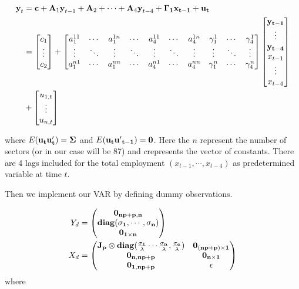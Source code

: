 \documentclass[11pt,a4paper,]{article}
\begin{document}
\begin{align}
\textbf{y}_t&=\textbf{c}+\textbf{A}_1 \textbf{y}_{t-1}+\textbf{A}_2+\cdots+\textbf{A}_4\textbf{y}_{t-4}+\bf{\Gamma}_1\textbf{x}_{t-1}+\bf{u}_t\\
&=
\begin{bmatrix}
c_1\\
\vdots\\
c_2
\end{bmatrix}
+
\begin{bmatrix}
a_1^{11}&\cdots&a_1^{1n}&\cdots&a_4^{11}&\cdots&a_4^{1n}&\gamma_1^{1}&\cdots&\gamma_4^{1}\\
\vdots&\ddots&\vdots&\ddots&\vdots&\ddots&\vdots&\vdots&\ddots&\vdots\\
a_1^{n1}&\cdots&a_1^{nn}&\cdots&a_4^{n1}&\cdots&a_4^{nn}&\gamma_1^n&\cdots&\gamma_4^n\\
\end{bmatrix}
\begin{bmatrix}
\bf{y}_{t-1}\\
\vdots\\
\bf{y}_{t-4}\\
x_{t-1}\\
\vdots\\
x_{t-4}
\end{bmatrix}\\
&+
\begin{bmatrix}
u_{1,t}\\
\vdots\\
u_{n,t}
\end{bmatrix}\\
\end{align}

where \(E(\bf{u}_t\bf{u}'_t)=\bf{\Sigma}\) and \(E(\bf{u}_t\bf{u'}_{t-1})=0\). Here the \(n\) represent the number of sectors (or in our case will be 87) and \(c\)represents the vector of constants. There are 4 lags included for the total employment \((x_{t-1},\cdots,x_{t-4})\) as predetermined variable at time \(t\).

Then we implement our VAR by defining dummy observations.

\[
\begin{aligned}
Y_d&=
\begin{pmatrix}
\bf0_{np+p,n}\\
\bf diag(\bf{\sigma_1,\cdots,\sigma_n})\\
\bf0_{1\times n}
\end{pmatrix}\\
X_d&=
\begin{pmatrix}
\bf{J_p}\otimes diag(\frac{\sigma_1}{\lambda}\cdots\frac{\sigma_n}{\lambda},\frac{\sigma_e}{\lambda})&\bf0_{(np+p)\times1}\\
\bf 0_{n,np+p}&\bf 0_{n\times1}
\\
\bf 0_{1,np+p}&\bf \epsilon
\end{pmatrix}
\end{aligned}
\] where
\end{document}
